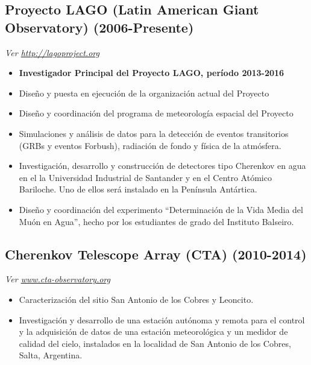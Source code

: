\subsection*{Proyecto LAGO (Latin American Giant Observatory) (2006-Presente)}
{\small{\textit{Ver \href{http://lagoproject.org}{http://lagoproject.org}}}}
\begin{itemize}
  \item {\bf{Investigador Principal del Proyecto LAGO, período 2013-2016}}
\item Diseño y puesta en ejecución de la organización actual del Proyecto
\item Diseño y coordinación del programa de meteorología espacial del Proyecto
\item Simulaciones y análisis de datos para la detección de eventos transitorios (GRBs y eventos Forbush), radiación de fondo y física de la atmósfera.
\item Investigación, desarrollo y construcción de detectores tipo Cherenkov en agua en el la Universidad Industrial de Santander y en el Centro Atómico Bariloche. Uno de ellos será instalado en la Península Antártica. 
\item Diseño y coordinación del experimento ``Determinación de la Vida Media del Muón en Agua'', hecho por los estudiantes de grado del Instituto Balseiro.
\end{itemize}

\subsection*{Cherenkov Telescope Array (CTA) (2010-2014)}
{\small{\textit{Ver \href{http://www.cta-observatory.org}{www.cta-observatory.org}}}}
\begin{itemize}
\item Caracterización del sitio San Antonio de los Cobres y Leoncito. %
\item Investigación y desarrollo de una estación autónoma y remota para el control y la adquisición de datos de una estación meteorológica y un medidor de calidad del cielo, instalados en la localidad de San Antonio de los Cobres, Salta, Argentina.
\end{itemize}

